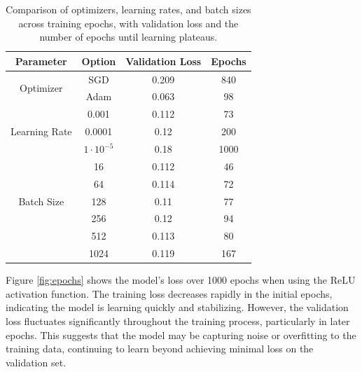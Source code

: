 \begin{table}[h!]
	\centering
		\caption{Comparison of optimizers, learning rates, and batch sizes across training epochs, with validation loss and the number of epochs until learning plateaus.}
	\begin{tabular}{|c|c|c|c|}
		\hline
		\textbf{Parameter} & \textbf{Option} & \textbf{Validation Loss} & \textbf{Epochs} \\
		\hline
		\multirow{2}{*}{Optimizer} & SGD & 0.209 & 840 \\
		\cline{2-4}
		& Adam & 0.063 & 98 \\
		\hline
		\multirow{3}{*}{Learning Rate} & 0.001 & 0.112 & 73 \\
		\cline{2-4}
		& 0.0001 & 0.12 & 200 \\
		\cline{2-4}
		& $1\cdot10^{-5}$&0.18 & 1000 \\
		\hline
		\multirow{5}{*}{Batch Size} & 16 & 0.112 & 46 \\
		\cline{2-4}
		& 64 & 0.114 & 72 \\
		\cline{2-4}
		& 128 &  0.11& 77 \\
		\cline{2-4}
		& 256 &  0.12  & 94 \\
		\cline{2-4}
		& 512 & 0.113 & 80 \\
		\cline{2-4}
		& 1024 & 0.119 & 167 \\
		\hline
	\end{tabular}

	\label{tab:comparison_across_epochs}
\end{table}




Figure \ref{fig:epochs} shows the model's loss over 1000 epochs when using the ReLU activation function. The training loss decreases rapidly in the initial epochs, indicating the model is learning quickly and stabilizing. However, the validation loss fluctuates significantly throughout the training process, particularly in later epochs. This suggests that the model may be capturing noise or overfitting to the training data, continuing to learn beyond achieving minimal loss on the validation set.


